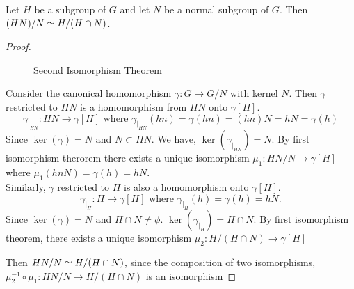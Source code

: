 \begin{theorem}
	Let $H$ be a subgroup of $G$ and let $N$ be a normal subgroup of $G$.
	Then $(HN)/N \simeq H/(H\cap N)$.
\end{theorem}
\begin{proof}
	\begin{figure}
		\centering
		\caption{Second Isomorphism Theorem}
	\end{figure}
	Consider the canonical homomorphism $\gamma : G \to G/N$ with kernel $N$.
	Then $\gamma$ restricted to $HN$ is a homomorphism from $HN$ onto $\gamma[H]$.
	\begin{equation}
		\gamma_{|_{HN}} : HN \to \gamma[H] \text{ where } \gamma_{|_{HN}}(hn) = \gamma(hn) = (hn)N = hN = \gamma(h)
	\end{equation}
	Since $\ker(\gamma) = N$ and $N \subset HN$. We have, $\ker(\gamma_{|_{HN}}) = N$. 
	By first isomorphism therorem there exists a unique isomorphism $\mu_1 : HN/N \to \gamma[H]$ where $\mu_1(hnN) = \gamma(h) = hN$.\\

	Similarly, $\gamma$ restricted to $H$ is also a homomorphism onto $\gamma[H]$.
	\begin{equation}
		\gamma_{|_H} : H \to \gamma[H] \text{ where } \gamma_{|_H}(h) = \gamma(h) = hN.
	\end{equation}
	Since $\ker(\gamma) = N$ and $H \cap N \ne \phi$. $\ker(\gamma_{|_H}) = H \cap N$. By first isomorphism theorem, there exists a unique isomorphism $\mu_2 : H/(H\cap N) \to \gamma[H]$%

	Then $HN/N \simeq H/(H \cap N)$, since the composition of two isomorphisms, $\mu_2^{-1}\circ \mu_1 : HN/N \to H/(H \cap N)$ is an isomorphism%
\end{proof}

